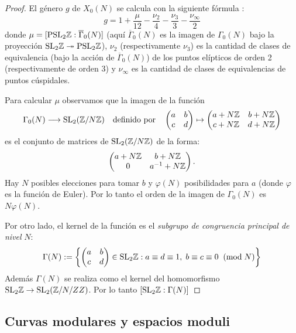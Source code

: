 \documentclass[../../tesis_maestria]{subfiles}
\begin{document}
\begin{proof}
  El g\'enero $g$ de $X_0(N)$ se calcula con la siguiente f\'ormula
  \cite[\S1.6, proposici\'on 1.40]{ShimuraITTATOAF}:
  \[
    g=1+\frac{\mu}{12}-\frac{\nu_2}{4}-\frac{\nu_3}{3}-\frac{\nu_{\infty}}{2}
  \]
  donde $\mu=[\mathrm{PSL}_2\mathbb{Z}:\overline{\Gamma}_0(N)]$ (aqu\'i $\overline{\Gamma}_0(N)$ es la imagen de
  $\Gamma_0(N)$ bajo la proyecci\'on $\mathrm{SL}_2\mathbb{Z}\twoheadrightarrow\mathrm{PSL}_2\mathbb{Z}$), $\nu_2$ (respectivamente $\nu_3$) es
  la cantidad de clases de equivalencia (bajo la acci\'on de $\overline{\Gamma}_0(N)$) de los
  puntos el\'ipticos de orden 2 (respectivamente de orden 3) y $\nu_{\infty}$ es la cantidad de
  clases de equivalencias de puntos c\'uspidales.

  Para calcular $\mu$ observamos que la imagen de la funci\'on
  \[
    \Gamma_0(N) \longrightarrow \mathrm{SL}_2(\mathbb{Z}/N\mathbb{Z}) \quad\text{definido por}\quad
    \begin{pmatrix}a&b\\c&d\end{pmatrix} \mapsto
    \begin{pmatrix}a+N\mathbb{Z}&b+N\mathbb{Z}\\c+N\mathbb{Z}&d+N\mathbb{Z}\end{pmatrix}
  \]
  es el conjunto de matrices de $\mathrm{SL}_2(\mathbb{Z}/N\mathbb{Z})$ de la forma:
  \[
    \begin{pmatrix} a+N\mathbb{Z}&b+N\mathbb{Z}\\0&a^{-1}+N\mathbb{Z} \end{pmatrix}.
  \]
  Hay $N$ posibles elecciones para tomar $b$ y $\varphi(N)$ posibilidades para $a$ (donde $\varphi$
  es la funci\'on de Euler). Por lo tanto el orden de la imagen de $\Gamma_0(N)$ es $N\varphi(N)$.

  Por otro lado, el kernel de la funci\'on es el \emph{subgrupo de congruencia principal de nivel}
  $N$:
  \[
    \Gamma(N):=\left\{
      \begin{pmatrix}a&b\\c&d\end{pmatrix}\in\mathrm{SL}_2\mathbb{Z} : a\equiv d\equiv 1,\; b\equiv c\equiv 0 \;\;(\mathrm{mod}\; N)
    \right\}
  \]
  Adem\'as $\Gamma(N)$ se realiza como el kernel del homomorfismo $\mathrm{SL}_2\mathbb{Z}\rightarrow\mathrm{SL}_2(\mathbb{Z}/N/ZZ)$. Por
  lo tanto $[\mathrm{SL}_2\mathbb{Z}:\Gamma(N)]$
\end{proof}

\subsection{Curvas modulares y espacios moduli}%
\end{document}
